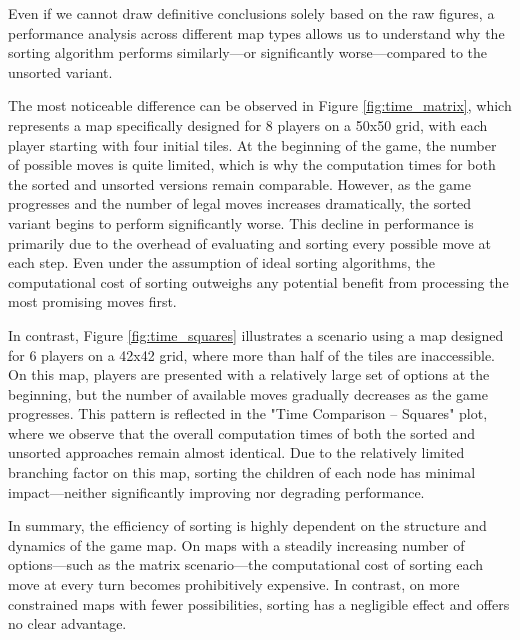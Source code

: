 \noindent Even if we cannot draw definitive conclusions solely based on the raw figures, a performance analysis across different map types allows us to understand why the sorting algorithm performs similarly—or significantly worse—compared to the unsorted variant.

\noindent The most noticeable difference can be observed in Figure \ref{fig:time_matrix}, which represents a map specifically designed for 8 players on a 50x50 grid, with each player starting with four initial tiles. At the beginning of the game, the number of possible moves is quite limited, which is why the computation times for both the sorted and unsorted versions remain comparable. However, as the game progresses and the number of legal moves increases dramatically, the sorted variant begins to perform significantly worse. This decline in performance is primarily due to the overhead of evaluating and sorting every possible move at each step. Even under the assumption of ideal sorting algorithms, the computational cost of sorting outweighs any potential benefit from processing the most promising moves first.

\noindent In contrast, Figure \ref{fig:time_squares} illustrates a scenario using a map designed for 6 players on a 42x42 grid, where more than half of the tiles are inaccessible. On this map, players are presented with a relatively large set of options at the beginning, but the number of available moves gradually decreases as the game progresses. This pattern is reflected in the "Time Comparison – Squares" plot, where we observe that the overall computation times of both the sorted and unsorted approaches remain almost identical. Due to the relatively limited branching factor on this map, sorting the children of each node has minimal impact—neither significantly improving nor degrading performance.

\noindent In summary, the efficiency of sorting is highly dependent on the structure and dynamics of the game map. On maps with a steadily increasing number of options—such as the matrix scenario—the computational cost of sorting each move at every turn becomes prohibitively expensive. In contrast, on more constrained maps with fewer possibilities, sorting has a negligible effect and offers no clear advantage.